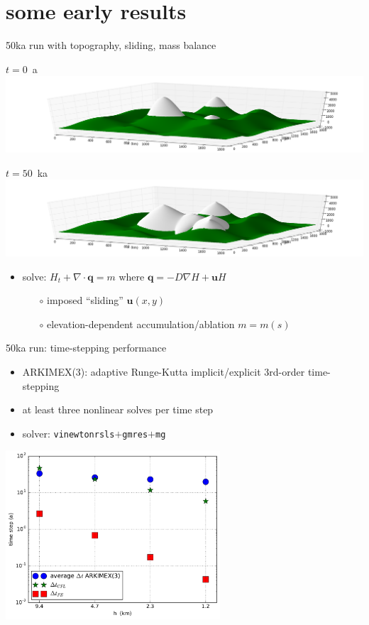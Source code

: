 \documentclass[hide notes,intlimits,usenames,dvipsnames]{beamer}
\newcommand{\Div}{\nabla\cdot}
\newcommand{\grad}{\nabla}
\begin{document}
\section{some early results}

\begin{frame}{50ka run with topography, sliding, mass balance}
\begin{center}
\mbox{$t=0$ a \includegraphics[height=0.25\textheight]{startsheet.png}}

\mbox{$t=50$ ka \includegraphics[height=0.25\textheight]{endsheet.png}}
\end{center}

\begin{itemize}
\item solve: $H_t + \Div \mathbf{q} = m$ where $\mathbf{q} = -D\grad H + \mathbf{u} H$
    \begin{itemize}
    \item[$\circ$] imposed ``sliding'' $\mathbf{u}(x,y)$
    \item[$\circ$] elevation-dependent accumulation/ablation $m=m(s)$
    \end{itemize}
\end{itemize}
\end{frame}


\begin{frame}{50ka run: time-stepping performance}
\begin{itemize}
\item ARKIMEX(3): adaptive Runge-Kutta implicit/explicit 3rd-order time-stepping
\item at least three nonlinear solves per time step
\item solver: \texttt{vinewtonrsls}$+$\texttt{gmres}$+$\texttt{mg}
\end{itemize}
\begin{center}
\includegraphics[width=0.6\textwidth]{dtfiftyka.pdf}
\end{center}
\end{frame}
\end{document}
